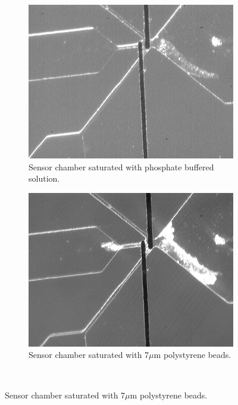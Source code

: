\begin{figure}[h]
    \centering
    \begin{subfigure}[b]{0.45\textwidth}
        \centering
        \includegraphics[width=\textwidth]{images/IS_empty.jpg}
        \caption{Sensor chamber saturated with phosphate buffered solution.}
    \end{subfigure}
    \hfill
    \begin{subfigure}[b]{0.45\textwidth}
        \centering
        \includegraphics[width=\textwidth]{images/IS_particle_saturation.jpg}
        \caption{Sensor chamber saturated with 7$\mu$m polystyrene beads.}
    \end{subfigure}
    \\

\end{figure}
